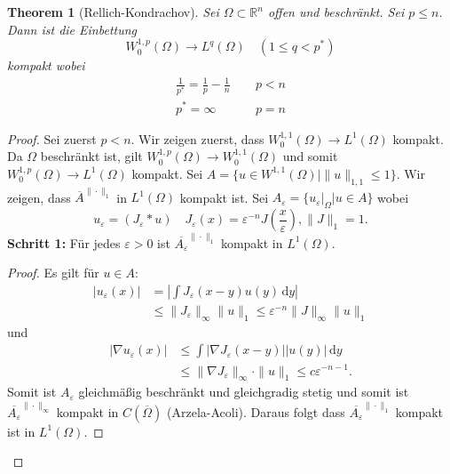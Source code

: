 \documentclass[
paper=a4,
bibtotocnumbered,
liststotocnumbered,
tablecaptionabove,
pointlessnumbers,
twoside,
openright,
10pt
]
{report}
\newtheorem{thm}{Theorem}[chapter]
\theoremstyle{definition}
\numberwithin{equation}{chapter}
\begin{document}
\begin{thm}[Rellich-Kondrachov]\label{3.8}
 Sei $\Omega \subset \mathbb R^n$ offen und beschränkt. Sei $p\le n$. Dann ist die Einbettung 
 \begin{equation}
  W_0^{1,p}(\Omega) \to L^q(\Omega) \quad (1\le q < p^*)
 \end{equation}
 kompakt wobei
 \begin{align*}
  \frac{1}{p^*} = \frac{1}{p} - \frac{1}{n} &\ \quad p<n\\
  p^*=\infty &\ \quad p=n
 \end{align*}
\end{thm}
\begin{proof}
Sei zuerst $p<n$. Wir zeigen zuerst, dass $W_0^{1,1}(\Omega) \to L^1(\Omega)$ kompakt. Da $\Omega$ beschränkt ist, gilt $W_0^{1,p}(\Omega) \to W_0^{1,1}(\Omega)$ und somit $W_0^{1,p}(\Omega) \to L^1(\Omega)$ kompakt. Sei $A=\{u\in W^{1,1}(\Omega) |\|u\|_{1,1} \le 1\}$. Wir zeigen, dass $\overline{A}^{\|\cdot\|_1}$ in $L^1(\Omega)$ kompakt ist. Sei $A_\varepsilon = \{u_\varepsilon\big |_\Omega |u\in A\}$ wobei
\begin{equation}
 u_\varepsilon = (J_\varepsilon * u) \quad J_\varepsilon(x) = \varepsilon^{-n} J( \frac{x}{\varepsilon}), \|J\|_1=1. 
\end{equation}
\textbf{Schritt 1:} Für jedes $\varepsilon >0$ ist $\overline{A_{\varepsilon}}^{\|\cdot\|_1}$ kompakt in $L^1(\Omega)$.
\begin{proof}
Es gilt für $u\in A$:
\begin{align*}
 |u_\varepsilon(x)| &= |\int J_\varepsilon(x-y) u(y) \, \mathrm dy| \\
 &\le \| J_\varepsilon \|_\infty \| u \|_1 \le \varepsilon^{-n} \| J\|_\infty\|u\|_1
\end{align*}
und 
\begin{align*}
 |\nabla u_\varepsilon(x)| &\le \int |\nabla J_\varepsilon(x-y)||u(y)|\, \mathrm dy\\
 &\le \| \nabla J_{\varepsilon}\|_\infty \cdot \|u\|_1 \le c \varepsilon^{-n-1}.
\end{align*}
Somit ist $A_\varepsilon$ gleichmäßig beschränkt und gleichgradig stetig und somit ist
$\overline{A_\varepsilon}^{\|\cdot \|_\infty}$ kompakt in $C(\overline{\Omega})$ (Arzela-Acoli). Daraus folgt dass $\overline{A_\varepsilon}^{\| \cdot \|_1}$ kompakt ist in $L^1(\Omega)$.


\end{proof}
\end{proof}
\end{document}
